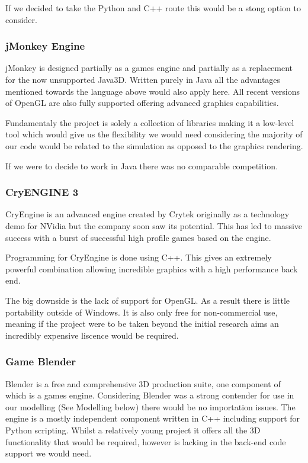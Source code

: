 If we decided to take the Python and C++ route this would be a stong
option to consider.


\subsubsection*{jMonkey Engine}

jMonkey is designed partially as a games engine and partially as a
replacement for the now unsupported Java3D. Written purely in Java
all the advantages mentioned towards the language above would also
apply here. All recent versions of OpenGL are also fully supported
offering advanced graphics capabilities.

Fundamentaly the project is solely a collection of libraries making
it a low-level tool which would give us the flexibility we would need
considering the majority of our code would be related to the simulation
as opposed to the graphics rendering.

If we were to decide to work in Java there was no comparable competition.


\subsubsection*{CryENGINE 3}

CryEngine is an advanced engine created by Crytek originally as a
technology demo for NVidia but the company soon saw its potential.
This has led to massive success with a burst of successful high profile
games based on the engine.

Programming for CryEngine is done using C++. This gives an extremely
powerful combination allowing incredible graphics with a high performance
back end.

The big downside is the lack of support for OpenGL. As a result there
is little portability outside of Windows. It is also only free for
non-commercial use, meaning if the project were to be taken beyond
the initial research aims an incredibly expensive liscence would be
required.


\subsubsection*{Game Blender}

Blender is a free and comprehensive 3D production suite, one component
of which is a games engine. Considering Blender was a strong contender
for use in our modelling (See Modelling below) there would be no importation
issues. The engine is a mostly independent component written in C++
including support for Python scripting. Whilst a relatively young
project it offers all the 3D functionality that would be required,
however is lacking in the back-end code support we would need.


